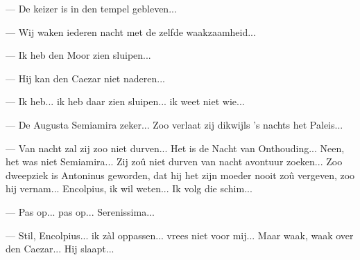\documentclass[a4paper, 12pt, oneside, dutch]{article}
\begin{document}
--- De keizer is in den tempel gebleven...

--- Wij waken iederen nacht met de zelfde waakzaamheid...

--- Ik heb den Moor zien sluipen...

--- Hij kan den Caezar niet naderen...

--- Ik heb... ik heb daar zien sluipen... ik weet niet wie...

--- De Augusta Semiamira zeker... Zoo verlaat zij dikwijls 's nachts het Paleis...

--- Van nacht zal zij zoo niet durven... Het is de Nacht van Onthouding... Neen, het was niet Semiamira... Zij zoû niet durven van nacht avontuur zoeken... Zoo dweepziek is Antoninus geworden, dat hij het zijn moeder nooit zoû vergeven, zoo hij vernam... Encolpius, ik wil weten... Ik volg die schim...

--- Pas op... pas op... Serenissima...

--- Stil, Encolpius... ik zàl oppassen... vrees niet voor mij... Maar waak, waak over den Caezar... Hij slaapt...
\end{document}
